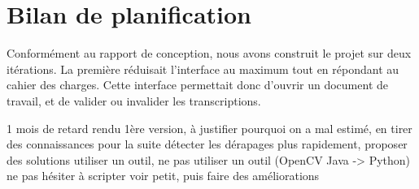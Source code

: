 \chapter{Bilan de planification}

Conformément au rapport de conception, nous avons construit le projet sur deux itérations. La première réduisait l'interface au maximum tout en répondant au cahier des charges. Cette interface permettait donc d'ouvrir un document de travail, et de valider ou invalider les transcriptions.

1 mois de retard rendu 1ère version, à justifier
pourquoi on a mal estimé, en tirer des connaissances pour la suite
détecter les dérapages plus rapidement, proposer des solutions
utiliser un outil, ne pas utiliser un outil (OpenCV Java -> Python)
ne pas hésiter à scripter
voir petit, puis faire des améliorations